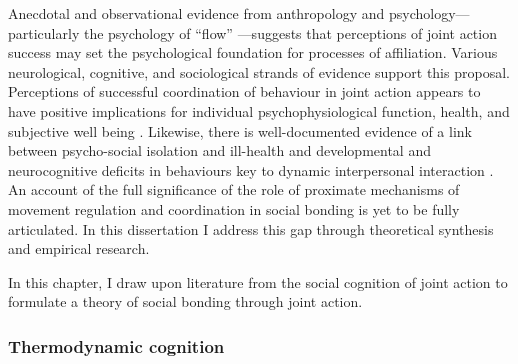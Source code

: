 \begin{CJK}{UTF8}{gbsn}
Anecdotal and observational evidence from anthropology and psychology---particularly the psychology of ``flow'' \citep{Csikszentmihalyi1992,Jackson1999}---suggests that perceptions of joint action success may set the psychological foundation for processes of affiliation.  Various neurological, cognitive, and sociological strands of evidence support this proposal.  Perceptions of successful coordination of behaviour in joint action appears to have positive implications for individual psychophysiological function, health, and subjective well being \citep{Wheatley2012}.  Likewise, there is well-documented evidence of a link between psycho-social isolation and ill-health and developmental and neurocognitive deficits in behaviours key to dynamic interpersonal interaction \citep[e.g.][]{Blakemore2005,Baron-Cohen1991}. An account of the full significance of the role of proximate mechanisms of movement regulation and coordination in social bonding is yet to be fully articulated. In this dissertation I address this gap through theoretical synthesis and empirical research.

In this chapter, I draw upon literature from the social cognition of joint action to formulate a theory of social bonding through joint action.














\subsubsection{Thermodynamic cognition}


\end{CJK}
